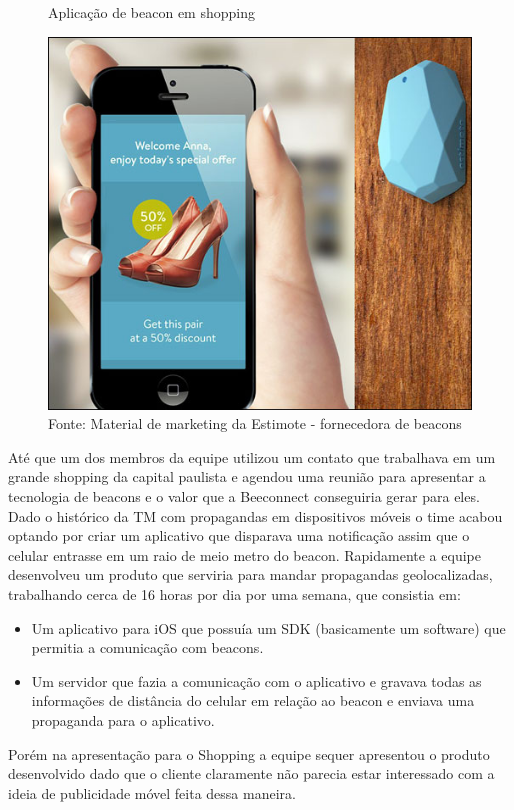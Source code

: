 \begin{figure}[H]
\caption{Aplicação de beacon em shopping}
\centerline{\includegraphics[scale=0.5]{img/beaconShopping}}
\label{fig:beaconShopping}
\caption* {Fonte: Material de marketing da Estimote - fornecedora de beacons}
\end{figure}

Até que um dos membros da equipe utilizou um contato que trabalhava em um grande shopping da capital paulista e agendou uma reunião para apresentar a tecnologia de beacons e o valor que a Beeconnect conseguiria gerar para eles. Dado o histórico da TM com propagandas em dispositivos móveis o time acabou optando por criar um aplicativo que disparava uma notificação assim que o celular entrasse em um raio de meio metro do beacon. Rapidamente a equipe desenvolveu  um produto que serviria para mandar propagandas geolocalizadas, trabalhando cerca de 16 horas por dia por uma semana, que consistia em:
\begin{itemize}
\item Um aplicativo para iOS que possuía um SDK (basicamente um software) que permitia a comunicação com beacons.
\item Um servidor que fazia a comunicação com o aplicativo e gravava todas as informações de distância do celular em relação ao beacon e enviava uma propaganda para o aplicativo.
\end{itemize}

Porém na apresentação para o Shopping a equipe sequer apresentou o produto desenvolvido dado que o cliente claramente não parecia estar interessado com a ideia de publicidade móvel feita dessa maneira.

